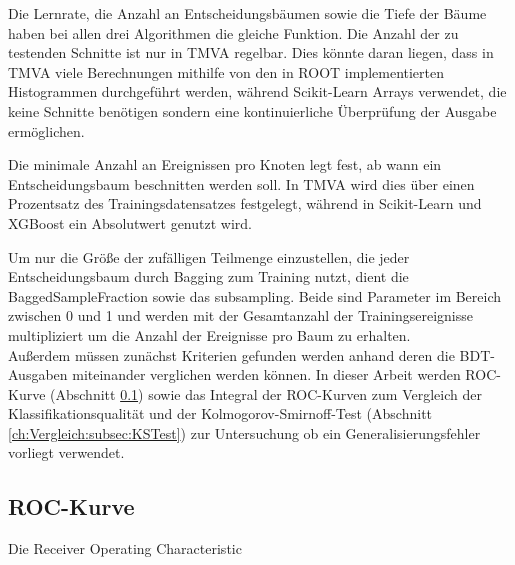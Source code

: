 Die Lernrate, die Anzahl an Entscheidungsb\"aumen sowie die Tiefe der B\"aume haben bei allen drei Algorithmen die gleiche Funktion. Die Anzahl der zu testenden Schnitte ist nur in TMVA regelbar. Dies k\"onnte daran liegen, dass in TMVA viele Berechnungen mithilfe von den in ROOT implementierten Histogrammen durchgef\"uhrt werden, w\"ahrend Scikit-Learn Arrays verwendet, die keine Schnitte ben\"otigen sondern eine kontinuierliche \"Uberpr\"ufung der Ausgabe erm\"oglichen. 

Die minimale Anzahl an Ereignissen pro Knoten legt fest, ab wann ein Entscheidungsbaum beschnitten werden soll. In TMVA wird dies \"uber einen Prozentsatz des Trainingsdatensatzes festgelegt, w\"ahrend in Scikit-Learn und XGBoost ein Absolutwert genutzt wird.

Um nur die Gr\"o\ss e der zuf\"alligen Teilmenge einzustellen, die jeder Entscheidungsbaum durch Bagging zum Training nutzt, dient die BaggedSampleFraction sowie das subsampling. Beide sind Parameter im Bereich zwischen 0 und 1 und werden mit der Gesamtanzahl der Trainingsereignisse multipliziert um die Anzahl der Ereignisse pro Baum zu erhalten.\\

Au\ss erdem m\"ussen zun\"achst Kriterien gefunden werden anhand deren die BDT-Ausgaben miteinander verglichen werden k\"onnen. In dieser Arbeit werden ROC-Kurve (Abschnitt \ref{ch:Vergleich:subsec:ROC}) sowie das Integral der ROC-Kurven zum Vergleich der Klassifikationsqualit\"at und der Kolmogorov-Smirnoff-Test (Abschnitt \ref{ch:Vergleich:subsec:KSTest}) zur Untersuchung ob ein Generalisierungsfehler vorliegt verwendet.

\subsection{ROC-Kurve}
\label{ch:Vergleich:subsec:ROC}

Die Receiver Operating Characteristic

